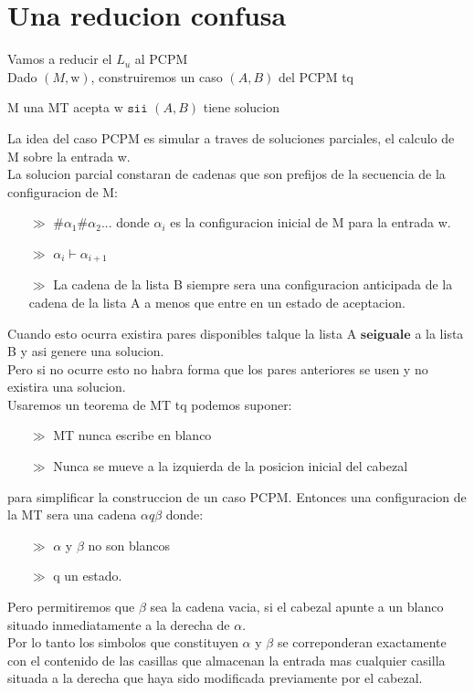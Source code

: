 \documentclass[12pt]{report}
\begin{document}
\section{Una reducion confusa}
Vamos a reducir el $L_u$ al PCPM\\
Dado $(M,\mathrm{w})$, construiremos un caso $(A,B)$ del PCPM tq
\begin{center}
M una MT acepta $\mathrm{w}$ $\mathtt{sii}$ $(A,B)$ tiene solucion
\end{center}
La idea del caso PCPM es simular a traves de soluciones parciales, el calculo de M sobre la entrada w.\\
La solucion parcial constaran de cadenas que son prefijos de la secuencia de la configuracion de M:
\begin{itemize}
\item[$\gg$] $ \# \alpha_1 \# \alpha_2 ...$ donde $\alpha_i$ es la configuracion inicial de M para la entrada w.
\item[$\gg$] $\alpha_i \vdash \alpha_{i+1}$
\item[$\gg$] La cadena de la lista B siempre sera una configuracion anticipada de la cadena de la lista A a menos que entre en un estado de aceptacion.
\end{itemize}
Cuando esto ocurra existira pares disponibles talque la lista A $\mathbf{se iguale}$ a la lista B y asi genere una solucion.\\
Pero si no ocurre esto no habra forma que los pares anteriores se usen y no existira una solucion.\\
Usaremos un teorema de MT tq podemos suponer:
\begin{itemize}
\item[$\gg$] MT nunca escribe en blanco
\item[$\gg$] Nunca se mueve a la izquierda de la posicion inicial del cabezal
\end{itemize}  
para simplificar la construccion de un caso PCPM. Entonces una configuracion de la MT sera una cadena $\alpha q \beta$ donde: 
\begin{itemize}
\item[$\gg$] $\alpha$ y $\beta$ no son blancos
\item[$\gg$] q un estado. 
\end{itemize}
Pero permitiremos que $\beta$ sea la cadena vacia, si el cabezal apunte a un blanco situado inmediatamente a la derecha de $\alpha$.\\
Por lo tanto los simbolos que constituyen $\alpha$ y $\beta$ se correponderan exactamente con el contenido de las casillas que almacenan la entrada mas cualquier casilla situada a la derecha que haya sido modificada previamente por el cabezal.
\end{document}
